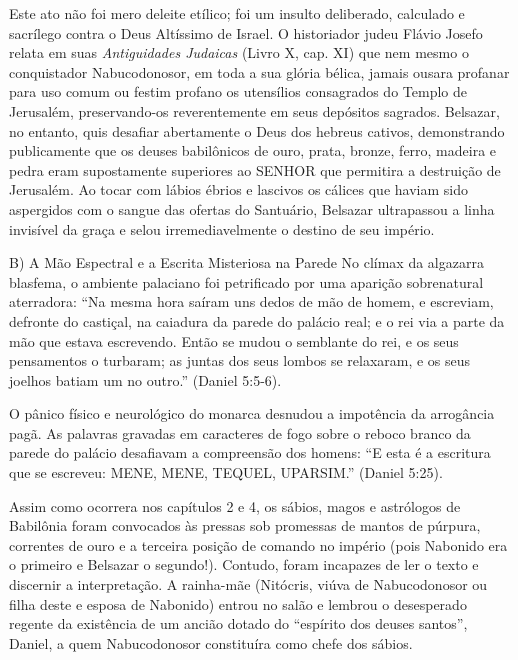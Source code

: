 \documentclass[11pt,a4paper,openany]{book}
\begin{document}
Este ato não foi mero deleite etílico; foi um insulto deliberado, calculado e sacrílego contra o Deus Altíssimo de Israel. O historiador judeu Flávio Josefo relata em suas \textit{Antiguidades Judaicas} (Livro X, cap. XI) que nem mesmo o conquistador Nabucodonosor, em toda a sua glória bélica, jamais ousara profanar para uso comum ou festim profano os utensílios consagrados do Templo de Jerusalém, preservando-os reverentemente em seus depósitos sagrados. Belsazar, no entanto, quis desafiar abertamente o Deus dos hebreus cativos, demonstrando publicamente que os deuses babilônicos de ouro, prata, bronze, ferro, madeira e pedra eram supostamente superiores ao SENHOR que permitira a destruição de Jerusalém. Ao tocar com lábios ébrios e lascivos os cálices que haviam sido aspergidos com o sangue das ofertas do Santuário, Belsazar ultrapassou a linha invisível da graça e selou irremediavelmente o destino de seu império.

B) A Mão Espectral e a Escrita Misteriosa na Parede
No clímax da algazarra blasfema, o ambiente palaciano foi petrificado por uma aparição sobrenatural aterradora:
``Na mesma hora saíram uns dedos de mão de homem, e escreviam, defronte do castiçal, na caiadura da parede do palácio real; e o rei via a parte da mão que estava escrevendo. Então se mudou o semblante do rei, e os seus pensamentos o turbaram; as juntas dos seus lombos se relaxaram, e os seus joelhos batiam um no outro.'' (Daniel 5:5-6).

O pânico físico e neurológico do monarca desnudou a impotência da arrogância pagã. As palavras gravadas em caracteres de fogo sobre o reboco branco da parede do palácio desafiavam a compreensão dos homens:
``E esta é a escritura que se escreveu: MENE, MENE, TEQUEL, UPARSIM.'' (Daniel 5:25).

Assim como ocorrera nos capítulos 2 e 4, os sábios, magos e astrólogos de Babilônia foram convocados às pressas sob promessas de mantos de púrpura, correntes de ouro e a terceira posição de comando no império (pois Nabonido era o primeiro e Belsazar o segundo!). Contudo, foram incapazes de ler o texto e discernir a interpretação. A rainha-mãe (Nitócris, viúva de Nabucodonosor ou filha deste e esposa de Nabonido) entrou no salão e lembrou o desesperado regente da existência de um ancião dotado do ``espírito dos deuses santos'', Daniel, a quem Nabucodonosor constituíra como chefe dos sábios.
\end{document}
